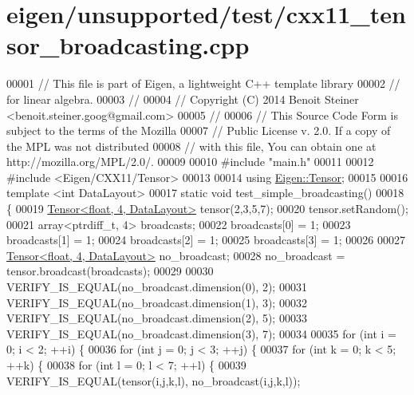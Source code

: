\hypertarget{eigen_2unsupported_2test_2cxx11__tensor__broadcasting_8cpp_source}{}\section{eigen/unsupported/test/cxx11\+\_\+tensor\+\_\+broadcasting.cpp}
\label{eigen_2unsupported_2test_2cxx11__tensor__broadcasting_8cpp_source}

\begin{DoxyCode}
00001 \textcolor{comment}{// This file is part of Eigen, a lightweight C++ template library}
00002 \textcolor{comment}{// for linear algebra.}
00003 \textcolor{comment}{//}
00004 \textcolor{comment}{// Copyright (C) 2014 Benoit Steiner <benoit.steiner.goog@gmail.com>}
00005 \textcolor{comment}{//}
00006 \textcolor{comment}{// This Source Code Form is subject to the terms of the Mozilla}
00007 \textcolor{comment}{// Public License v. 2.0. If a copy of the MPL was not distributed}
00008 \textcolor{comment}{// with this file, You can obtain one at http://mozilla.org/MPL/2.0/.}
00009 
00010 \textcolor{preprocessor}{#include "main.h"}
00011 
00012 \textcolor{preprocessor}{#include <Eigen/CXX11/Tensor>}
00013 
00014 \textcolor{keyword}{using} \hyperlink{class_eigen_1_1_tensor}{Eigen::Tensor};
00015 
00016 \textcolor{keyword}{template} <\textcolor{keywordtype}{int} DataLayout>
00017 \textcolor{keyword}{static} \textcolor{keywordtype}{void} test\_simple\_broadcasting()
00018 \{
00019   \hyperlink{class_eigen_1_1_tensor}{Tensor<float, 4, DataLayout>} tensor(2,3,5,7);
00020   tensor.setRandom();
00021   array<ptrdiff\_t, 4> broadcasts;
00022   broadcasts[0] = 1;
00023   broadcasts[1] = 1;
00024   broadcasts[2] = 1;
00025   broadcasts[3] = 1;
00026 
00027   \hyperlink{class_eigen_1_1_tensor}{Tensor<float, 4, DataLayout>} no\_broadcast;
00028   no\_broadcast = tensor.broadcast(broadcasts);
00029 
00030   VERIFY\_IS\_EQUAL(no\_broadcast.dimension(0), 2);
00031   VERIFY\_IS\_EQUAL(no\_broadcast.dimension(1), 3);
00032   VERIFY\_IS\_EQUAL(no\_broadcast.dimension(2), 5);
00033   VERIFY\_IS\_EQUAL(no\_broadcast.dimension(3), 7);
00034 
00035   \textcolor{keywordflow}{for} (\textcolor{keywordtype}{int} i = 0; i < 2; ++i) \{
00036     \textcolor{keywordflow}{for} (\textcolor{keywordtype}{int} j = 0; j < 3; ++j) \{
00037       \textcolor{keywordflow}{for} (\textcolor{keywordtype}{int} k = 0; k < 5; ++k) \{
00038         \textcolor{keywordflow}{for} (\textcolor{keywordtype}{int} l = 0; l < 7; ++l) \{
00039           VERIFY\_IS\_EQUAL(tensor(i,j,k,l), no\_broadcast(i,j,k,l));

\end{DoxyCode}
